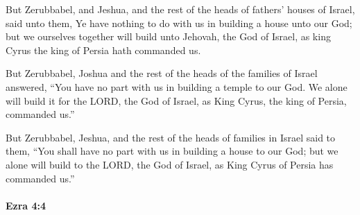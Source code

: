 			\begin{versebox}
					\item[BHS] 
					\item[LXX] 
					\item[ASV] But Zerubbabel, and Jeshua, and the rest of the heads of fathers' houses of Israel, said unto them, Ye have nothing to do with us in building a house unto our God; but we ourselves together will build unto Jehovah, the God of Israel, as king Cyrus the king of Persia hath commanded us.
					\item[NIV] But Zerubbabel, Joshua and the rest of the heads of the families of Israel answered, “You have no part with us in building a temple to our God. We alone will build it for the LORD, the God of Israel, as King Cyrus, the king of Persia, commanded us.”
					\item[NRSV] But Zerubbabel, Jeshua, and the rest of the heads of families in Israel said to them, “You shall have no part with us in building a house to our God; but we alone will build to the LORD, the God of Israel, as King Cyrus of Persia has commanded us.”
			\end{versebox}

		\paragraph{Ezra 4:4} %
			\label{EZRA-4-4}

